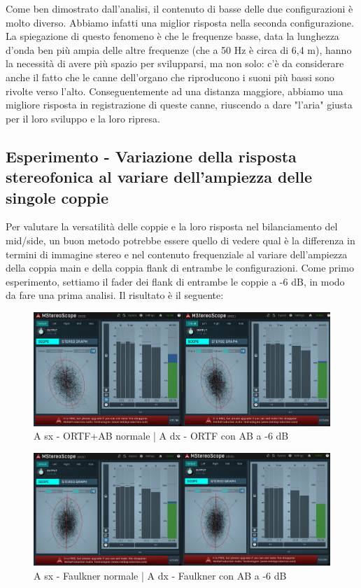 \documentclass{article}
\begin{document}
    Come ben dimostrato dall'analisi, il contenuto di basse delle due configurazioni è molto diverso. Abbiamo infatti una miglior risposta nella seconda configurazione. La spiegazione di questo fenomeno è che le frequenze basse, data la lunghezza d'onda ben più ampia delle altre frequenze (che a 50 Hz è circa di 6,4 m), hanno la necessità di avere più spazio per svilupparsi, ma non solo: c'è da considerare anche il fatto che le canne dell'organo che riproducono i suoni più bassi sono rivolte verso l'alto. Conseguentemente ad una distanza maggiore, abbiamo una migliore risposta in registrazione di queste canne, riuscendo a dare "l'aria" giusta per il loro sviluppo e la loro ripresa.
 

\subsection{Esperimento - Variazione della risposta stereofonica al variare dell'ampiezza delle singole coppie}
    Per valutare la versatilità delle coppie e la loro risposta nel bilanciamento del mid/side, un buon metodo potrebbe essere quello di vedere qual è la differenza in termini di immagine stereo e nel contenuto frequenziale al variare dell'ampiezza della coppia main e della coppia flank di entrambe le configurazioni.
    Come primo esperimento, settiamo il fader dei flank di entrambe le coppie a -6 dB, in modo da fare una prima analisi. Il risultato è il seguente:
    
    \begin{figure}[H]
        \centering
        \includegraphics[width=1\textwidth]{images/3PLOT-6AB-STEREOSCOPE-FRONTEPALCO.png}
         \caption{\label{fig11}A sx - ORTF+AB normale | A dx - ORTF con AB a -6 dB}
    \end{figure}
    
    \begin{figure}[H]
        \centering
        \includegraphics[width=1\textwidth]{images/3PLOT-6AB-STEREOSCOPE-FAULKNER.png}
         \caption{\label{fig11}A sx - Faulkner normale | A dx - Faulkner con AB a -6 dB}
    \end{figure}
    
\end{document}
